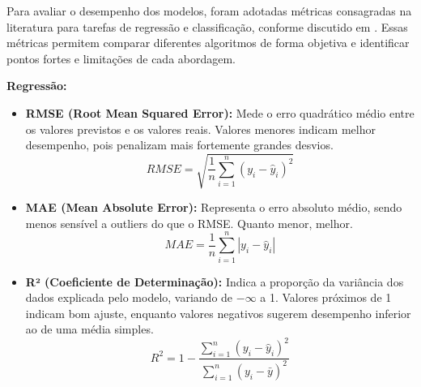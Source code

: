 Para avaliar o desempenho dos modelos, foram adotadas métricas consagradas na literatura para tarefas de regressão e classificação, conforme discutido em \cite{analisemacro2023}. Essas métricas permitem comparar diferentes algoritmos de forma objetiva e identificar pontos fortes e limitações de cada abordagem.

\textbf{Regressão:}
\begin{itemize}
    \item \textbf{RMSE (Root Mean Squared Error):} Mede o erro quadrático médio entre os valores previstos e os valores reais. Valores menores indicam melhor desempenho, pois penalizam mais fortemente grandes desvios.
    \begin{equation*}
        RMSE = \sqrt{\frac{1}{n}\sum_{i=1}^n (y_i - \hat{y}_i)^2}
    \end{equation*}
    \item \textbf{MAE (Mean Absolute Error):} Representa o erro absoluto médio, sendo menos sensível a outliers do que o RMSE. Quanto menor, melhor.
    \begin{equation*}
        MAE = \frac{1}{n}\sum_{i=1}^n |y_i - \hat{y}_i|
    \end{equation*}
    \item \textbf{R² (Coeficiente de Determinação):} Indica a proporção da variância dos dados explicada pelo modelo, variando de $-\infty$ a 1. Valores próximos de 1 indicam bom ajuste, enquanto valores negativos sugerem desempenho inferior ao de uma média simples.
    \begin{equation*}
        R^2 = 1 - \frac{\sum_{i=1}^n (y_i - \hat{y}_i)^2}{\sum_{i=1}^n (y_i - \bar{y})^2}
    \end{equation*}
\end{itemize}

